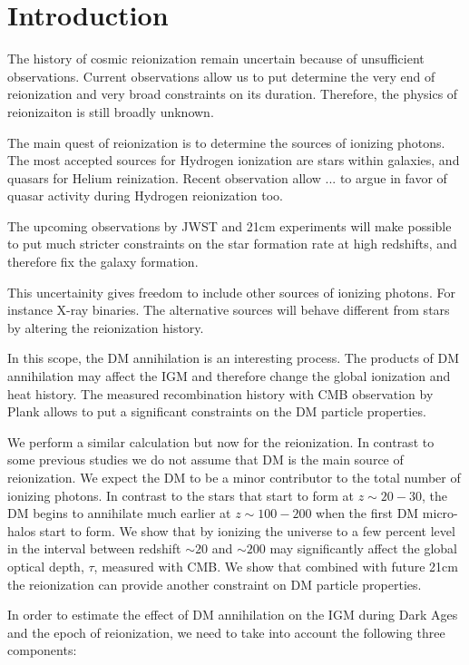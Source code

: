 \section{Introduction}

The history of cosmic reionization remain uncertain because of unsufficient observations. Current observations allow us to put determine the very end of reionization and very broad constraints on its duration. Therefore, the physics of reionizaiton is still broadly unknown.

The main quest of reionization is to determine the sources of ionizing photons. The most accepted sources for Hydrogen ionization are stars within galaxies, and quasars for Helium reinization. Recent observation allow ... to argue in favor of quasar activity during Hydrogen reionization too.

The upcoming observations by JWST and 21cm experiments will make possible to put much stricter constraints on the star formation rate at high redshifts, and therefore fix the galaxy formation.

This uncertainity gives freedom to include other sources of ionizing photons. For instance X-ray binaries. The alternative sources will behave different from stars by altering the reionization history. 

In this scope, the DM annihilation is an interesting process. The products of DM annihilation may affect the IGM and therefore change the global ionization and heat history. The measured recombination history with CMB observation by Plank allows \cite{2015arXiv150603811S} to put a significant constraints on the DM particle properties.

We perform a similar calculation but now for the reionization. In contrast to some previous studies \cite{2009JCAP...10..009C, 2009PhRvD..80c5007B} we do not assume that DM is the main source of reionization. We expect the DM to be a minor contributor to the total number of ionizing photons. In contrast to the stars that start to form at $z\sim 20-30$, the DM begins to annihilate much earlier at $z\sim100-200$ when the first DM micro-halos start to form. We show that by ionizing the universe to a few percent level in the interval between redshift $\sim20$ and $\sim200$ may significantly affect the global optical depth, $\tau$, measured with CMB. We show that combined with future 21cm the reionization can provide another constraint on DM particle properties.

In order to estimate the effect of DM annihilation on the IGM during Dark Ages and the epoch of reionization, we need to take into account the following three components:

